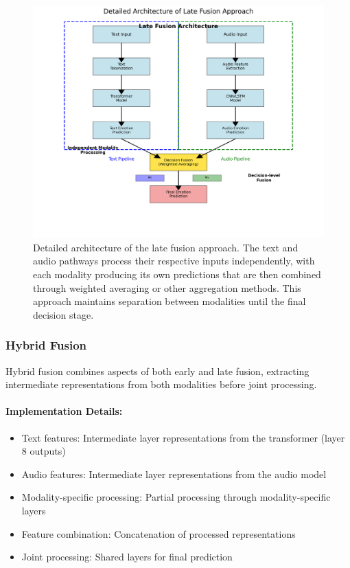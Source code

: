 \documentclass[12pt]{article}
\begin{document}
\begin{figure}[h]
    \centering
    \includegraphics[width=0.9\linewidth]{Figures/late_fusion_detailed_proper.png}
    \caption{Detailed architecture of the late fusion approach. The text and audio pathways process their respective inputs independently, with each modality producing its own predictions that are then combined through weighted averaging or other aggregation methods. This approach maintains separation between modalities until the final decision stage.}
    \label{fig:late_fusion}
\end{figure}

\subsubsection{Hybrid Fusion}
Hybrid fusion combines aspects of both early and late fusion, extracting intermediate representations from both modalities before joint processing.

\paragraph{Implementation Details:}
\begin{itemize}
    \item Text features: Intermediate layer representations from the transformer (layer 8 outputs)
    \item Audio features: Intermediate layer representations from the audio model
    \item Modality-specific processing: Partial processing through modality-specific layers
    \item Feature combination: Concatenation of processed representations
    \item Joint processing: Shared layers for final prediction
\end{itemize}
\end{document}
